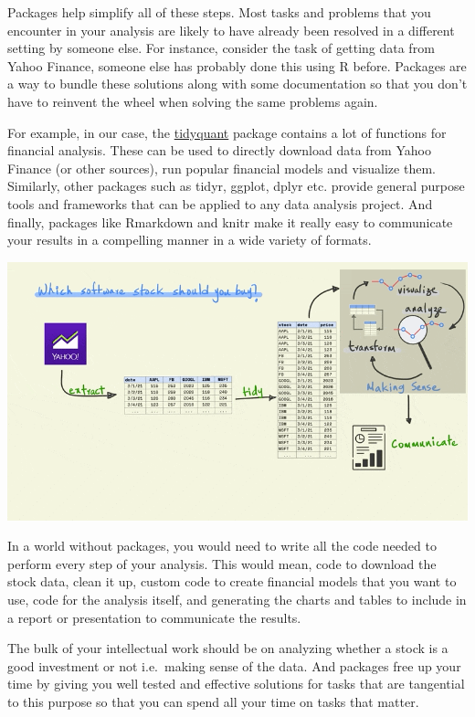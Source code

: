 \documentclass[
]{book}
\begin{document}
Packages help simplify all of these steps. Most tasks and problems that you encounter in your analysis are likely to have already been resolved in a different setting by someone else. For instance, consider the task of getting data from Yahoo Finance, someone else has probably done this using R before. Packages are a way to bundle these solutions along with some documentation so that you don't have to reinvent the wheel when solving the same problems again.

For example, in our case, the \href{https://business-science.github.io/tidyquant/}{tidyquant} package contains a lot of functions for financial analysis. These can be used to directly download data from Yahoo Finance (or other sources), run popular financial models and visualize them. Similarly, other packages such as tidyr, ggplot, dplyr etc. provide general purpose tools and frameworks that can be applied to any data analysis project. And finally, packages like Rmarkdown and knitr make it really easy to communicate your results in a compelling manner in a wide variety of formats.

\includegraphics{assets/packages/gifs/package_use.gif}

In a world without packages, you would need to write all the code needed to perform every step of your analysis. This would mean, code to download the stock data, clean it up, custom code to create financial models that you want to use, code for the analysis itself, and generating the charts and tables to include in a report or presentation to communicate the results.

The bulk of your intellectual work should be on analyzing whether a stock is a good investment or not i.e.~making sense of the data. And packages free up your time by giving you well tested and effective solutions for tasks that are tangential to this purpose so that you can spend all your time on tasks that matter.
\end{document}
